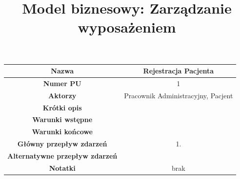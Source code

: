 \documentclass{article}
\title{Model biznesowy: Zarządzanie wyposażeniem}
\author{}
\date{}
\begin{document}
    \maketitle
	\begin{tabular}{|c|c|}
	\hline
	\textbf{Nazwa} & Rejestracja Pacjenta \\
	\hline
	\textbf{Numer PU} & 1 \\
	\hline
	\textbf{Aktorzy} & Pracownik Administracyjny, Pacjent \\
	\hline
	\textbf{Krótki opis} & \\
	\hline
	\textbf{Warunki wstępne} & \\
	\hline
	\textbf{Warunki końcowe} & \\
	\hline
	\textbf{Główny przepływ zdarzeń} & 
		1. \newline
		   \\
	\hline
	\textbf{Alternatywne przepływ zdarzeń} & \\
	\hline 
	\textbf{Notatki} & brak \\
	\hline
	
	\end{tabular}
\end{document}
